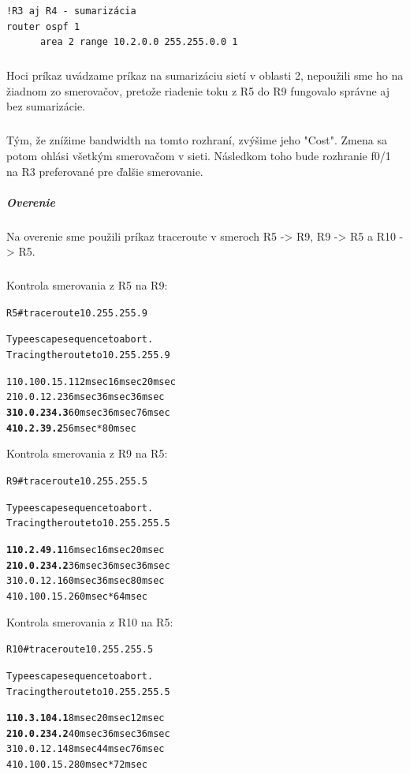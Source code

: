 \documentclass[12pt,twoside,a4paper]{article}
\begin{document}
\noindent
{\selectfont
\begin{small}
\begin{verbatim}
!R3 aj R4 - sumarizácia
router ospf 1
      area 2 range 10.2.0.0 255.255.0.0 1

\end{verbatim}
\end{small}
}

\subparagraph{}
Hoci príkaz uvádzame príkaz na sumarizáciu sietí v oblasti 2, nepoužili sme ho na žiadnom zo smerovačov, pretože riadenie toku z R5 do R9 fungovalo správne aj bez sumarizácie.

\subparagraph{}
Tým, že znížime bandwidth na tomto rozhraní, zvýšime jeho "Cost". Zmena sa potom ohlási všetkým smerovačom v sieti. Následkom toho bude rozhranie f0/1 na R3 preferované pre ďalšie smerovanie.

\subparagraph{Overenie}
\subparagraph{}
Na overenie sme použili príkaz traceroute v smeroch R5 -\textgreater{} R9, R9 -\textgreater{} R5 a R10 -\textgreater{} R5.
\subparagraph{}

\noindent
Kontrola smerovania  z R5 na R9:
\noindent
{\selectfont
\begin{small}
\begin{alltt}
R5#traceroute 10.255.255.9     

Type escape sequence to abort.
Tracing the route to 10.255.255.9

  1 10.100.15.1 12 msec 16 msec 20 msec
  2 10.0.12.2 36 msec 36 msec 36 msec
  \textbf{3 10.0.234.3} 60 msec 36 msec 76 msec
  \textbf{4 10.2.39.2} 56 msec *  80 msec


\end{alltt}
\end{small}
}

\noindent
Kontrola smerovania  z R9 na R5:
\noindent
{\selectfont
\begin{small}
\begin{alltt}
R9#traceroute 10.255.255.5

Type escape sequence to abort.
Tracing the route to 10.255.255.5

  \textbf{1 10.2.49.1} 16 msec 16 msec 20 msec
  \textbf{2 10.0.234.2} 36 msec 36 msec 36 msec
  3 10.0.12.1 60 msec 36 msec 80 msec
  4 10.100.15.2 60 msec *  64 msec


\end{alltt}
\end{small}
}

\noindent
Kontrola smerovania z R10 na R5:
\noindent
{\selectfont
\begin{small}
\begin{alltt}
R10#traceroute 10.255.255.5

Type escape sequence to abort.
Tracing the route to 10.255.255.5

  \textbf{1 10.3.104.1} 8 msec 20 msec 12 msec
  \textbf{2 10.0.234.2} 40 msec 36 msec 36 msec
  3 10.0.12.1 48 msec 44 msec 76 msec
  4 10.100.15.2 80 msec *  72 msec


\end{alltt}
\end{small}
}
\end{document}
